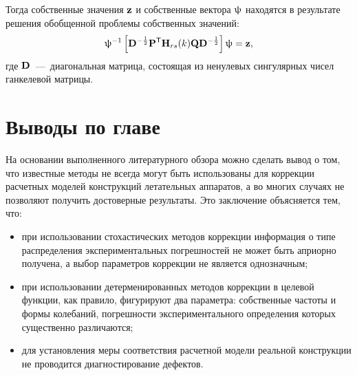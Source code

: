 Тогда собственные значения $ \mathbf{z} $ и собственные вектора $ \mathbf{\uppsi} $ находятся в результате решения обобщенной проблемы собственных значений:
\begin{equation}
	\mathbf{\uppsi} ^ {-1} \left[ \mathbf{D} ^ {-\frac{1}{2}} \mathbf{P} ^ \mathsf{T} \mathbf{H}_{rs}(k) \mathbf{Q} \mathbf{D} ^ {-\frac{1}{2}} \right] \uppsi = \mathbf{z},
\end{equation}
где $ \mathbf{D} $~---~диагональная матрица, состоящая из ненулевых сингулярных чисел ганкелевой матрицы.

\section{Выводы по главе \thechapter}

На основании выполненного литературного обзора можно сделать вывод о том, что известные методы не всегда могут быть использованы для коррекции расчетных моделей конструкций летательных аппаратов, а во многих случаях не позволяют получить достоверные результаты. Это заключение объясняется тем, что:
\begin{itemize}
	\item при использовании стохастических методов коррекции информация о типе распределения экспериментальных погрешностей не может быть априорно получена, а выбор параметров коррекции не является однозначным;
	\item при использовании детерменированных методов коррекции в целевой функции, как правило, фигурируют два параметра: собственные частоты и формы колебаний, погрешности экспериментального определения которых существенно различаются;
	\item для установления меры соответствия расчетной модели реальной конструкции не проводится диагностирование дефектов. 
\end{itemize}